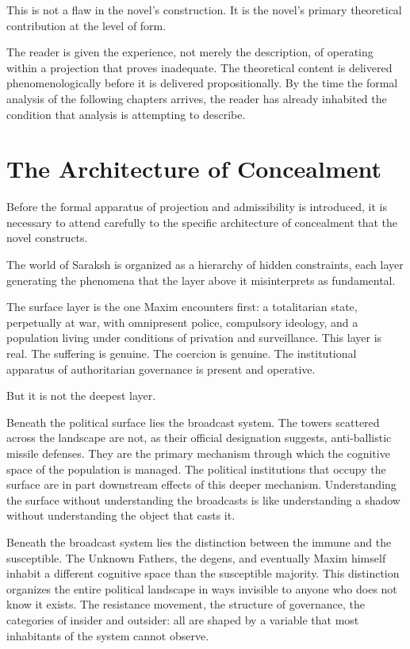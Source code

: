 \documentclass[12pt, a4paper]{article}
\theoremstyle{plain}
\theoremstyle{definition}
\theoremstyle{remark}
\begin{document}
This is not a flaw in the novel's construction.
It is the novel's primary theoretical contribution
at the level of form.

The reader is given the experience, not merely the
description, of operating within a projection that
proves inadequate. The theoretical content is
delivered phenomenologically before it is delivered
propositionally. By the time the formal analysis of
the following chapters arrives, the reader has already
inhabited the condition that analysis is attempting
to describe.

\section{The Architecture of Concealment}

Before the formal apparatus of projection and
admissibility is introduced, it is necessary to
attend carefully to the specific architecture of
concealment that the novel constructs.

The world of Saraksh is organized as a hierarchy
of hidden constraints, each layer generating the
phenomena that the layer above it misinterprets
as fundamental.

The surface layer is the one Maxim encounters first:
a totalitarian state, perpetually at war, with
omnipresent police, compulsory ideology, and a
population living under conditions of privation and
surveillance. This layer is real. The suffering is
genuine. The coercion is genuine. The institutional
apparatus of authoritarian governance is present
and operative.

But it is not the deepest layer.

Beneath the political surface lies the broadcast
system. The towers scattered across the landscape
are not, as their official designation suggests,
anti-ballistic missile defenses. They are the
primary mechanism through which the cognitive
space of the population is managed. The political
institutions that occupy the surface are in part
downstream effects of this deeper mechanism.
Understanding the surface without understanding
the broadcasts is like understanding a shadow
without understanding the object that casts it.

Beneath the broadcast system lies the distinction
between the immune and the susceptible. The Unknown
Fathers, the degens, and eventually Maxim himself
inhabit a different cognitive space than the
susceptible majority. This distinction organizes
the entire political landscape in ways invisible
to anyone who does not know it exists. The
resistance movement, the structure of governance,
the categories of insider and outsider: all are
shaped by a variable that most inhabitants of the
system cannot observe.
\end{document}
